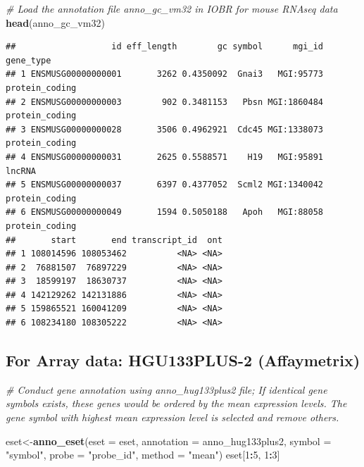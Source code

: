 \documentclass[
  12pt,
]{book}
\newenvironment{Shaded}{\begin{snugshade}}{\end{snugshade}}
\newcommand{\AttributeTok}[1]{\textcolor[rgb]{0.13,0.29,0.53}{#1}}
\newcommand{\CommentTok}[1]{\textcolor[rgb]{0.56,0.35,0.01}{\textit{#1}}}
\newcommand{\DecValTok}[1]{\textcolor[rgb]{0.00,0.00,0.81}{#1}}
\newcommand{\FunctionTok}[1]{\textcolor[rgb]{0.13,0.29,0.53}{\textbf{#1}}}
\newcommand{\NormalTok}[1]{#1}
\newcommand{\OtherTok}[1]{\textcolor[rgb]{0.56,0.35,0.01}{#1}}
\newcommand{\SpecialCharTok}[1]{\textcolor[rgb]{0.81,0.36,0.00}{\textbf{#1}}}
\newcommand{\StringTok}[1]{\textcolor[rgb]{0.31,0.60,0.02}{#1}}
\begin{document}
\begin{Shaded}
\begin{Highlighting}[]
\CommentTok{\# Load the annotation file \textasciigrave{}anno\_gc\_vm32\textasciigrave{} in IOBR for mouse RNAseq data}
\FunctionTok{head}\NormalTok{(anno\_gc\_vm32)}
\end{Highlighting}
\end{Shaded}

\begin{verbatim}
##                   id eff_length        gc symbol      mgi_id      gene_type
## 1 ENSMUSG00000000001       3262 0.4350092  Gnai3   MGI:95773 protein_coding
## 2 ENSMUSG00000000003        902 0.3481153   Pbsn MGI:1860484 protein_coding
## 3 ENSMUSG00000000028       3506 0.4962921  Cdc45 MGI:1338073 protein_coding
## 4 ENSMUSG00000000031       2625 0.5588571    H19   MGI:95891         lncRNA
## 5 ENSMUSG00000000037       6397 0.4377052  Scml2 MGI:1340042 protein_coding
## 6 ENSMUSG00000000049       1594 0.5050188   Apoh   MGI:88058 protein_coding
##       start       end transcript_id  ont
## 1 108014596 108053462          <NA> <NA>
## 2  76881507  76897229          <NA> <NA>
## 3  18599197  18630737          <NA> <NA>
## 4 142129262 142131886          <NA> <NA>
## 5 159865521 160041209          <NA> <NA>
## 6 108234180 108305222          <NA> <NA>
\end{verbatim}

\hypertarget{for-array-data-hgu133plus-2-affaymetrix}{%
\subsection{For Array data: HGU133PLUS-2 (Affaymetrix)}\label{for-array-data-hgu133plus-2-affaymetrix}}

\begin{Shaded}
\begin{Highlighting}[]
\CommentTok{\# Conduct gene annotation using \textasciigrave{}anno\_hug133plus2\textasciigrave{} file; If identical gene symbols exists, these genes would be ordered by the mean expression levels. The gene symbol with highest mean expression level is selected and remove others. }

\NormalTok{eset}\OtherTok{\textless{}{-}}\FunctionTok{anno\_eset}\NormalTok{(}\AttributeTok{eset       =}\NormalTok{ eset,}
                \AttributeTok{annotation =}\NormalTok{ anno\_hug133plus2,}
                \AttributeTok{symbol     =} \StringTok{"symbol"}\NormalTok{,}
                \AttributeTok{probe      =} \StringTok{"probe\_id"}\NormalTok{,}
                \AttributeTok{method     =} \StringTok{"mean"}\NormalTok{)}
\NormalTok{eset[}\DecValTok{1}\SpecialCharTok{:}\DecValTok{5}\NormalTok{, }\DecValTok{1}\SpecialCharTok{:}\DecValTok{3}\NormalTok{]}
\end{Highlighting}
\end{Shaded}
\end{document}
